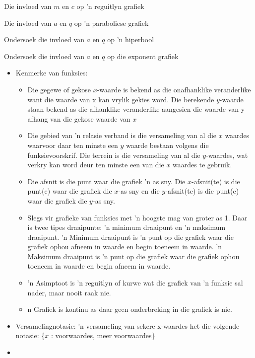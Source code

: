 \begin{Ondersoek}{Die invloed van $m$ en $c$ op 'n reguitlyn grafiek}
\begin{Ondersoek}{Die invloed van $a$ en $q$ op 'n paraboliese grafiek}
\begin{Ondersoek}{Ondersoek die invloed van $a$ en $q$ op 'n hiperbool}
\begin{Ondersoek}{Ondersoek die invloed van $a$ en $q$ op die exponent grafiek}



\begin{itemize}[noitemsep]
\item Kenmerke van funksies: 
\begin{itemize}[noitemsep]
\item Die gegewe of gekose $x$-waarde is bekend as die onafhanklike veranderlike want die waarde van x kan
vrylik gekies word. Die berekende $y$-waarde staan bekend as die afhanklike veranderlike aangesien
die waarde van y afhang van die gekose waarde van $x$
\item Die gebied van ’n relasie verband is die versameling van al die $x$ waardes waarvoor daar ten minste een $y$ waarde bestaan volgens die funksievoorskrif. Die terrein is die versameling van al die $y$-waardes, wat verkry kan word deur ten minste een van die $x$ waardes te gebruik.
\item Die afsnit is die punt waar die grafiek ’n as sny. Die $x$-afsnit(te) is die punt(e) waar die grafiek die $x$-as
sny en die $y$-afsnit(te) is die punt(e) waar die grafiek die $y$-as sny. 
\item Slegs vir grafieke van funksies met ’n hoogste mag van groter as 1. Daar is twee tipes draaipunte: ’n
minimum draaipunt en ’n maksimum draaipunt. ’n Minimum draaipunt is ’n punt op die grafiek waar
die grafiek ophou afneem in waarde en begin toeneem in waarde. ’n Maksimum draaipunt is ’n punt
op die grafiek waar die grafiek ophou toeneem in waarde en begin afneem in waarde. 
\item ’n Asimptoot is ’n reguitlyn of kurwe wat die grafiek van ’n funksie sal nader, maar nooit raak nie.
\item n Grafiek is kontinu as daar geen onderbreking in die grafiek is nie. 
\end{itemize}
\item 
Versamelingnotasie: ’n versameling van sekere x-waardes het die volgende notasie: \{$x$ : voorwaardes,
meer voorwaardes\}
\item 


\end{itemize}
\end{Ondersoek}
\end{Ondersoek}
\end{Ondersoek}
\end{Ondersoek}
